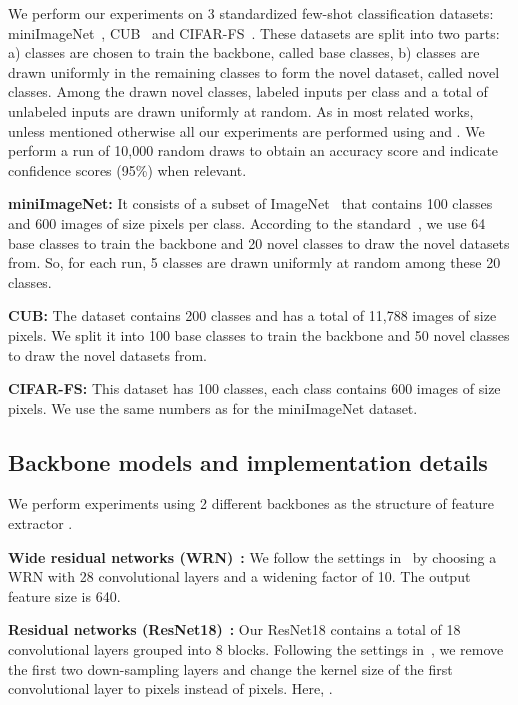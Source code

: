 \documentclass[a4paper,conference]{IEEEtran}
\begin{document}
We perform our experiments on 3 standardized few-shot classification datasets: miniImageNet~\cite{vinyals2016matching}, CUB~\cite{wah2011caltech} and CIFAR-FS~\cite{bertinetto2018meta}. These datasets are split into two parts: a)  classes are chosen to train the backbone, called base classes, b)  classes are drawn uniformly in the remaining classes to form the novel dataset, called novel classes. Among the  drawn novel classes,  labeled inputs per class and a total of  unlabeled inputs are drawn uniformly at random. As in most related works, unless mentioned otherwise all our experiments are performed using  and . We perform a run of 10,000 random draws to obtain an accuracy score and indicate confidence scores (95\%) when relevant.

\textbf{miniImageNet:} It consists of a subset of ImageNet~\cite{russakovsky2015imagenet} that contains 100 classes and 600 images of size  pixels per class. According to the standard~\cite{ravi2016optimization}, we use 64 base classes to train the backbone and 20 novel classes to draw the novel datasets from. So, for each run, 5 classes are drawn uniformly at random among these 20 classes.

\textbf{CUB:} The dataset contains 200 classes and has a total of 11,788 images of size  pixels. We split it into 100 base classes to train the backbone and 50 novel classes to draw the novel datasets from.

\textbf{CIFAR-FS:} This dataset has 100 classes, each class contains 600 images of size  pixels. We use the same numbers as for the miniImageNet dataset.

\subsection{Backbone models and implementation details}
We perform experiments using 2 different backbones as the structure of feature extractor .

\textbf{Wide residual networks (WRN)}~\cite{zagoruyko2016wide}\textbf{:} We follow the settings in~\cite{mangla2020charting} by choosing a WRN with 28 convolutional layers and a widening factor of 10. The output feature size  is 640.

\textbf{Residual networks (ResNet18)}~\cite{he2016deep}\textbf{:} Our ResNet18 contains a total of 18 convolutional layers grouped into 8 blocks. Following the settings in~\cite{wang2019simpleshot}, we remove the first two down-sampling layers and change the kernel size of the first convolutional layer to  pixels instead of  pixels. Here, .
\end{document}
